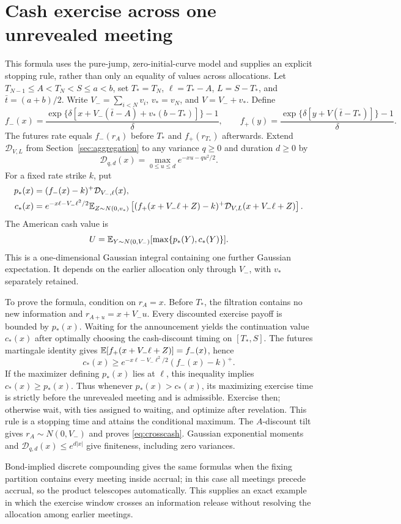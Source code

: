 \section{Cash exercise across one unrevealed meeting}\label{app:crossmeeting}
This formula uses the pure-jump, zero-initial-curve model and supplies an explicit stopping rule, rather than only an equality of values across allocations. Let
$T_{N-1}\leq A<T_N<S\leq a<b$, set $T_*=T_N$, $\ell=T_*-A$, $L=S-T_*$, and $\bar t=(a+b)/2$. Write $V_-=\sum_{i<N}v_i$, $v_*=v_N$, and $V=V_-+v_*$. Define
\[
f_-(x)=\frac{\exp\{\delta[x+V_-(\bar t-A)+v_*(b-T_*)]\}-1}{\delta},
\qquad
f_+(y)=\frac{\exp\{\delta[y+V(\bar t-T_*)]\}-1}{\delta}.
\]
The futures rate equals $f_-(r_A)$ before $T_*$ and $f_+(r_{T_*})$ afterwards. Extend $\mathcal D_{V,L}$ from Section~\ref{sec:aggregation} to any variance $q\geq0$ and duration $d\geq0$ by
\[
\mathcal D_{q,d}(x)=\max_{0\leq u\leq d}e^{-xu-qu^2/2}.
\]
For a fixed rate strike $k$, put
\begin{align*}
p_*(x)&=(f_-(x)-k)^+\mathcal D_{V_-,\ell}(x),\\
c_*(x)&=e^{-x\ell-V_-\ell^2/2}
  \mathbb E_{Z\sim N(0,v_*)}\left[
       (f_+(x+V_-\ell+Z)-k)^+
                  \mathcal D_{V,L}(x+V_-\ell+Z)\right].
\end{align*}
The American cash value is
\begin{equation}\label{eq:crosscash}
U=\mathbb E_{Y\sim N(0,V_-)}[\max\{p_*(Y),c_*(Y)\}].
\end{equation}
This is a one-dimensional Gaussian integral containing one further Gaussian expectation. It depends on the earlier allocation only through $V_-$, with $v_*$ separately retained.

To prove the formula, condition on $r_A=x$. Before $T_*$, the filtration contains no new information and $r_{A+u}=x+V_-u$. Every discounted exercise payoff is bounded by $p_*(x)$. Waiting for the announcement yields the continuation value $c_*(x)$ after optimally choosing the cash-discount timing on $[T_*,S]$. The futures martingale identity gives
$\mathbb E[f_+(x+V_-\ell+Z)]=f_-(x)$, hence
\[
c_*(x)\geq e^{-x\ell-V_-\ell^2/2}(f_-(x)-k)^+.
\]
If the maximizer defining $p_*(x)$ lies at $\ell$, this inequality implies $c_*(x)\geq p_*(x)$. Thus whenever $p_*(x)>c_*(x)$, its maximizing exercise time is strictly before the unrevealed meeting and is admissible. Exercise then; otherwise wait, with ties assigned to waiting, and optimize after revelation. This rule is a stopping time and attains the conditional maximum. The $A$-discount tilt gives $r_A\sim N(0,V_-)$ and proves \eqref{eq:crosscash}. Gaussian exponential moments and $\mathcal D_{q,d}(x)\leq e^{d|x|}$ give finiteness, including zero variances.

Bond-implied discrete compounding gives the same formulas when the fixing partition contains every meeting inside accrual; in this case all meetings precede accrual, so the product telescopes automatically. This supplies an exact example in which the exercise window crosses an information release without resolving the allocation among earlier meetings.
